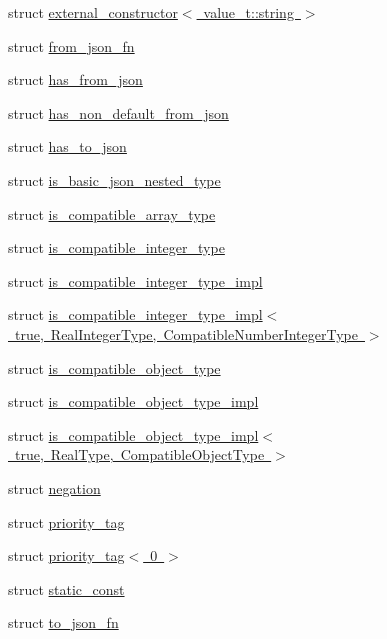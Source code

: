 \begin{DoxyCompactItemize}
\item 
struct \mbox{\hyperlink{structnlohmann_1_1detail_1_1external__constructor_3_01value__t_1_1string_01_4}{external\+\_\+constructor$<$ value\+\_\+t\+::string $>$}}
\item 
struct \mbox{\hyperlink{structnlohmann_1_1detail_1_1from__json__fn}{from\+\_\+json\+\_\+fn}}
\item 
struct \mbox{\hyperlink{structnlohmann_1_1detail_1_1has__from__json}{has\+\_\+from\+\_\+json}}
\item 
struct \mbox{\hyperlink{structnlohmann_1_1detail_1_1has__non__default__from__json}{has\+\_\+non\+\_\+default\+\_\+from\+\_\+json}}
\item 
struct \mbox{\hyperlink{structnlohmann_1_1detail_1_1has__to__json}{has\+\_\+to\+\_\+json}}
\item 
struct \mbox{\hyperlink{structnlohmann_1_1detail_1_1is__basic__json__nested__type}{is\+\_\+basic\+\_\+json\+\_\+nested\+\_\+type}}
\item 
struct \mbox{\hyperlink{structnlohmann_1_1detail_1_1is__compatible__array__type}{is\+\_\+compatible\+\_\+array\+\_\+type}}
\item 
struct \mbox{\hyperlink{structnlohmann_1_1detail_1_1is__compatible__integer__type}{is\+\_\+compatible\+\_\+integer\+\_\+type}}
\item 
struct \mbox{\hyperlink{structnlohmann_1_1detail_1_1is__compatible__integer__type__impl}{is\+\_\+compatible\+\_\+integer\+\_\+type\+\_\+impl}}
\item 
struct \mbox{\hyperlink{structnlohmann_1_1detail_1_1is__compatible__integer__type__impl_3_01true_00_01RealIntegerType_0064332c4ada80cab3523aebd66ccc012a}{is\+\_\+compatible\+\_\+integer\+\_\+type\+\_\+impl$<$ true, Real\+Integer\+Type, Compatible\+Number\+Integer\+Type $>$}}
\item 
struct \mbox{\hyperlink{structnlohmann_1_1detail_1_1is__compatible__object__type}{is\+\_\+compatible\+\_\+object\+\_\+type}}
\item 
struct \mbox{\hyperlink{structnlohmann_1_1detail_1_1is__compatible__object__type__impl}{is\+\_\+compatible\+\_\+object\+\_\+type\+\_\+impl}}
\item 
struct \mbox{\hyperlink{structnlohmann_1_1detail_1_1is__compatible__object__type__impl_3_01true_00_01RealType_00_01CompatibleObjectType_01_4}{is\+\_\+compatible\+\_\+object\+\_\+type\+\_\+impl$<$ true, Real\+Type, Compatible\+Object\+Type $>$}}
\item 
struct \mbox{\hyperlink{structnlohmann_1_1detail_1_1negation}{negation}}
\item 
struct \mbox{\hyperlink{structnlohmann_1_1detail_1_1priority__tag}{priority\+\_\+tag}}
\item 
struct \mbox{\hyperlink{structnlohmann_1_1detail_1_1priority__tag_3_010_01_4}{priority\+\_\+tag$<$ 0 $>$}}
\item 
struct \mbox{\hyperlink{structnlohmann_1_1detail_1_1static__const}{static\+\_\+const}}
\item 
struct \mbox{\hyperlink{structnlohmann_1_1detail_1_1to__json__fn}{to\+\_\+json\+\_\+fn}}
\end{DoxyCompactItemize}
